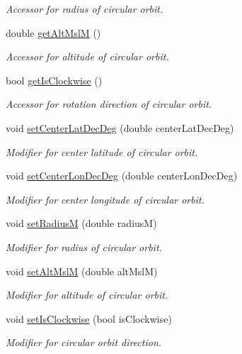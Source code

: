 \begin{DoxyCompactItemize}
\begin{DoxyCompactList}\small\item\em Accessor for radius of circular orbit. \end{DoxyCompactList}\item 
double \hyperlink{class_circular_orbit_belief_a7cd0cfd450e978a9111743637b4c5594}{getAltMslM} ()
\begin{DoxyCompactList}\small\item\em Accessor for altitude of circular orbit. \end{DoxyCompactList}\item 
bool \hyperlink{class_circular_orbit_belief_a17d5add0e83fb24473ca60a7f9b4a268}{getIsClockwise} ()
\begin{DoxyCompactList}\small\item\em Accessor for rotation direction of circular orbit. \end{DoxyCompactList}\item 
void \hyperlink{class_circular_orbit_belief_a19a699b6ce00ea4e2a9098384cf57197}{setCenterLatDecDeg} (double centerLatDecDeg)
\begin{DoxyCompactList}\small\item\em Modifier for center latitude of circular orbit. \end{DoxyCompactList}\item 
void \hyperlink{class_circular_orbit_belief_a179d0457b9800aa799fbbe52cf495a3f}{setCenterLonDecDeg} (double centerLonDecDeg)
\begin{DoxyCompactList}\small\item\em Modifier for center longitude of circular orbit. \end{DoxyCompactList}\item 
void \hyperlink{class_circular_orbit_belief_a8efd107273f9ad56cb405deaf350b8d4}{setRadiusM} (double radiusM)
\begin{DoxyCompactList}\small\item\em Modifier for radius of circular orbit. \end{DoxyCompactList}\item 
void \hyperlink{class_circular_orbit_belief_a919c5fb94c962895aca1f9fcb3e3d076}{setAltMslM} (double altMslM)
\begin{DoxyCompactList}\small\item\em Modifier for altitude of circular orbit. \end{DoxyCompactList}\item 
void \hyperlink{class_circular_orbit_belief_aaa469ecd98b27578d56987aa362343d2}{setIsClockwise} (bool isClockwise)
\begin{DoxyCompactList}\small\item\em Modifier for circular orbit direction. \end{DoxyCompactList}\end{DoxyCompactItemize}
